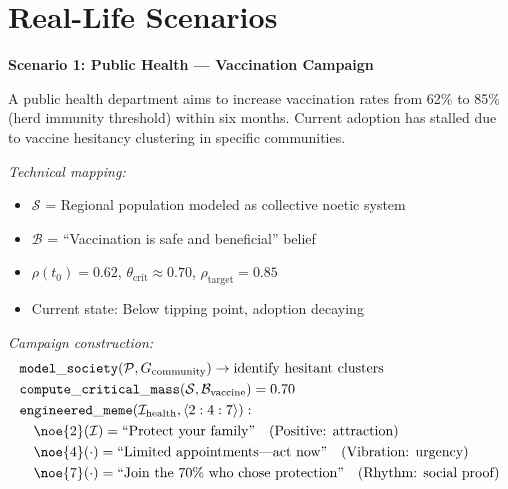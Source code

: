\section{Real-Life Scenarios}

\begin{tcolorbox}[colback=yellow!5!white,colframe=yellow!65!black,title=\textbf{Real-Life Scenarios: Social Engineering Applications},breakable]

\textbf{Scenario 1: Public Health --- Vaccination Campaign}

A public health department aims to increase vaccination rates from 62\% to 85\% (herd immunity threshold) within six months. Current adoption has stalled due to vaccine hesitancy clustering in specific communities.

\textit{Technical mapping:}
\begin{itemize}
    \item $\mathcal{S}$ = Regional population modeled as collective noetic system
    \item $\mathcal{B}$ = ``Vaccination is safe and beneficial'' belief
    \item $\rho(t_0) = 0.62$, $\theta_{\mathrm{crit}} \approx 0.70$, $\rho_{\mathrm{target}} = 0.85$
    \item Current state: Below tipping point, adoption decaying
\end{itemize}

\textit{Campaign construction:}
\begin{align*}
    &\mathtt{model\_society}(\mathcal{P}, G_{\mathrm{community}}) \to \text{identify hesitant clusters} \\
    &\mathtt{compute\_critical\_mass}(\mathcal{S}, \mathcal{B}_{\mathrm{vaccine}}) = 0.70 \\
    &\mathtt{engineered\_meme}(\mathcal{I}_{\mathrm{health}}, \langle 2:4:7 \rangle): \\
    &\quad \noe{2}(\mathcal{I}) = \text{``Protect your family''} \quad \text{(Positive: attraction)} \\
    &\quad \noe{4}(\cdot) = \text{``Limited appointments---act now''} \quad \text{(Vibration: urgency)} \\
    &\quad \noe{7}(\cdot) = \text{``Join the 70\% who chose protection''} \quad \text{(Rhythm: social proof)}
\end{align*}


\end{tcolorbox}
